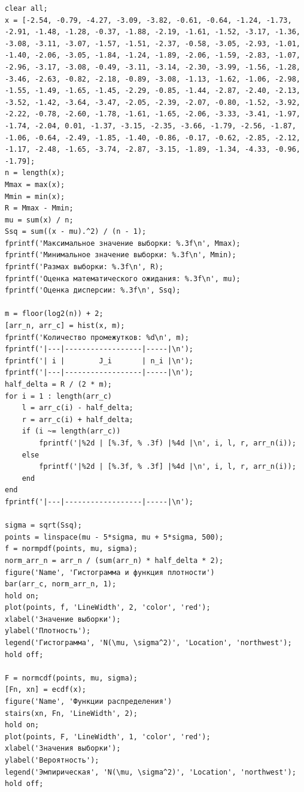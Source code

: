 \begin{lstlisting}[label={lst}]
clear all;
x = [-2.54, -0.79, -4.27, -3.09, -3.82, -0.61, -0.64, -1.24, -1.73, -2.91, -1.48, -1.28, -0.37, -1.88, -2.19, -1.61, -1.52, -3.17, -1.36, -3.08, -3.11, -3.07, -1.57, -1.51, -2.37, -0.58, -3.05, -2.93, -1.01, -1.40, -2.06, -3.05, -1.84, -1.24, -1.89, -2.06, -1.59, -2.83, -1.07, -2.96, -3.17, -3.08, -0.49, -3.11, -3.14, -2.30, -3.99, -1.56, -1.28, -3.46, -2.63, -0.82, -2.18, -0.89, -3.08, -1.13, -1.62, -1.06, -2.98, -1.55, -1.49, -1.65, -1.45, -2.29, -0.85, -1.44, -2.87, -2.40, -2.13, -3.52, -1.42, -3.64, -3.47, -2.05, -2.39, -2.07, -0.80, -1.52, -3.92, -2.22, -0.78, -2.60, -1.78, -1.61, -1.65, -2.06, -3.33, -3.41, -1.97, -1.74, -2.04, 0.01, -1.37, -3.15, -2.35, -3.66, -1.79, -2.56, -1.87, -1.06, -0.64, -2.49, -1.85, -1.40, -0.86, -0.17, -0.62, -2.85, -2.12, -1.17, -2.48, -1.65, -3.74, -2.87, -3.15, -1.89, -1.34, -4.33, -0.96, -1.79];
n = length(x);
Mmax = max(x);
Mmin = min(x);
R = Mmax - Mmin;
mu = sum(x) / n;
Ssq = sum((x - mu).^2) / (n - 1);
fprintf('Максимальное значение выборки: %.3f\n', Mmax);
fprintf('Минимальное значение выборки: %.3f\n', Mmin);
fprintf('Размах выборки: %.3f\n', R);
fprintf('Оценка математического ожидания: %.3f\n', mu);
fprintf('Оценка дисперсии: %.3f\n', Ssq);

m = floor(log2(n)) + 2;
[arr_n, arr_c] = hist(x, m);
fprintf('Количество промежутков: %d\n', m);
fprintf('|---|------------------|-----|\n');
fprintf('| i |        J_i       | n_i |\n');
fprintf('|---|------------------|-----|\n');
half_delta = R / (2 * m);
for i = 1 : length(arr_c)
    l = arr_c(i) - half_delta;
    r = arr_c(i) + half_delta;
    if (i ~= length(arr_c))
        fprintf('|%2d | [%.3f, % .3f) |%4d |\n', i, l, r, arr_n(i));
    else
        fprintf('|%2d | [%.3f, % .3f] |%4d |\n', i, l, r, arr_n(i));
    end
end
fprintf('|---|------------------|-----|\n');

sigma = sqrt(Ssq);
points = linspace(mu - 5*sigma, mu + 5*sigma, 500);
f = normpdf(points, mu, sigma);
norm_arr_n = arr_n / (sum(arr_n) * half_delta * 2);
figure('Name', 'Гистограмма и функция плотности')
bar(arr_c, norm_arr_n, 1);
hold on;
plot(points, f, 'LineWidth', 2, 'color', 'red');
xlabel('Значение выборки');
ylabel('Плотность');
legend('Гистограмма', 'N(\mu, \sigma^2)', 'Location', 'northwest');
hold off;

F = normcdf(points, mu, sigma);
[Fn, xn] = ecdf(x);
figure('Name', 'Функции распределения')
stairs(xn, Fn, 'LineWidth', 2);
hold on;
plot(points, F, 'LineWidth', 1, 'color', 'red');
xlabel('Значения выборки');
ylabel('Вероятность');
legend('Эмпирическая', 'N(\mu, \sigma^2)', 'Location', 'northwest');
hold off;

\end{lstlisting}


